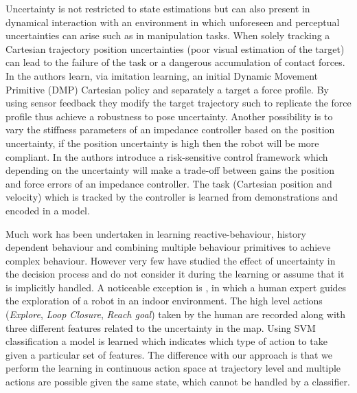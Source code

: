 Uncertainty is not restricted to state estimations but can also present in dynamical interaction with an environment in which 
unforeseen and perceptual uncertainties can arise such as in manipulation tasks. When solely tracking a Cartesian trajectory 
position uncertainties (poor visual estimation of the target) can lead to the failure of the task or a dangerous accumulation 
of contact forces. In \cite{online_pre_sensor_2011} the authors learn, via imitation learning, an initial 
Dynamic Movement Primitive (DMP) Cartesian policy and separately a target a force profile. By using sensor feedback they 
modify the target trajectory such to replicate the force profile thus achieve a robustness to pose uncertainty. Another possibility
is to vary the stiffness parameters of an impedance controller \cite{Klas_icra_2012} based on the position uncertainty, 
if the position uncertainty is high then the robot will be more compliant. In \cite{MedinaSH13} the authors introduce a 
risk-sensitive control framework which depending on the uncertainty will make a trade-off between gains the position and force errors 
of an impedance controller. The task (Cartesian position and velocity) which is tracked by the controller is learned from demonstrations and encoded in 
a model.




Much work has been undertaken in learning reactive-behaviour, history dependent behaviour and combining multiple behaviour primitives to achieve
complex behaviour. However very few have studied the effect of uncertainty in the decision process and 
do not consider it during the learning or assume that it is implicitly handled.
A noticeable exception is \cite{GeorgiosLidoris}, in which a human expert guides the exploration of a robot in an indoor environment. 
The high level actions (\textit{Explore}, \textit{Loop Closure}, \textit{Reach goal}) taken by the human are recorded along with three different features related to the uncertainty in the map. 
Using SVM classification a model is learned which indicates which type of action to take given a particular set of 
features. The difference with our approach is that we perform 
the learning in continuous action space at trajectory level and multiple actions are possible given the same state, which cannot be handled by a classifier.

